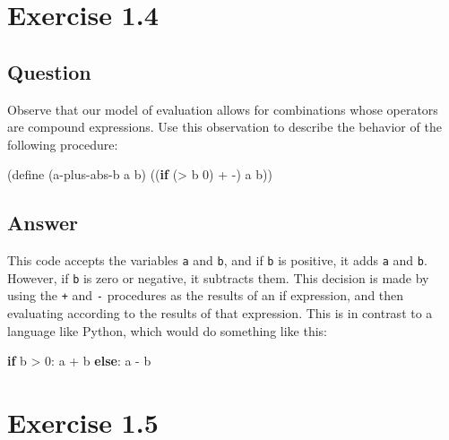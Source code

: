 \documentclass[
]{article}
\newenvironment{Shaded}{}{}
\newcommand{\ControlFlowTok}[1]{\textcolor[rgb]{0.00,0.44,0.13}{\textbf{#1}}}
\newcommand{\DecValTok}[1]{\textcolor[rgb]{0.25,0.63,0.44}{#1}}
\newcommand{\ExtensionTok}[1]{#1}
\newcommand{\FunctionTok}[1]{\textcolor[rgb]{0.02,0.16,0.49}{#1}}
\newcommand{\KeywordTok}[1]{\textcolor[rgb]{0.00,0.44,0.13}{\textbf{#1}}}
\newcommand{\NormalTok}[1]{#1}
\newcommand{\OperatorTok}[1]{\textcolor[rgb]{0.40,0.40,0.40}{#1}}
\begin{document}
\hypertarget{exercise-1.4}{%
\section{Exercise 1.4}\label{exercise-1.4}}

\hypertarget{question-3}{%
\subsection{Question}\label{question-3}}

Observe that our model of evaluation allows for combinations whose
operators are compound expressions. Use this observation to describe the
behavior of the following procedure:

\hypertarget{a-plus-abs-b}{%
\label{a-plus-abs-b}}%
\begin{Shaded}
\begin{Highlighting}[numbers=left,,]
\NormalTok{(}\ExtensionTok{define}\FunctionTok{ }\NormalTok{(a{-}plus{-}abs{-}b a b)}
\NormalTok{  ((}\KeywordTok{if}\NormalTok{ (}\OperatorTok{\textgreater{}}\NormalTok{ b }\DecValTok{0}\NormalTok{) }\OperatorTok{+} \OperatorTok{{-}}\NormalTok{) a b))}
\end{Highlighting}
\end{Shaded}

\hypertarget{answer-3}{%
\subsection{Answer}\label{answer-3}}

This code accepts the variables \texttt{a} and \texttt{b}, and if
\texttt{b} is positive, it adds \texttt{a} and \texttt{b}. However, if
\texttt{b} is zero or negative, it subtracts them. This decision is made
by using the \texttt{+} and \texttt{-} procedures as the results of an
if expression, and then evaluating according to the results of that
expression. This is in contrast to a language like Python, which would
do something like this:

\begin{Shaded}
\begin{Highlighting}[]
\ControlFlowTok{if}\NormalTok{ b }\OperatorTok{\textgreater{}} \DecValTok{0}\NormalTok{: a }\OperatorTok{+}\NormalTok{ b}
\ControlFlowTok{else}\NormalTok{: a }\OperatorTok{{-}}\NormalTok{ b}
\end{Highlighting}
\end{Shaded}

\hypertarget{exercise-1.5}{%
\section{Exercise 1.5}\label{exercise-1.5}}
\end{document}
